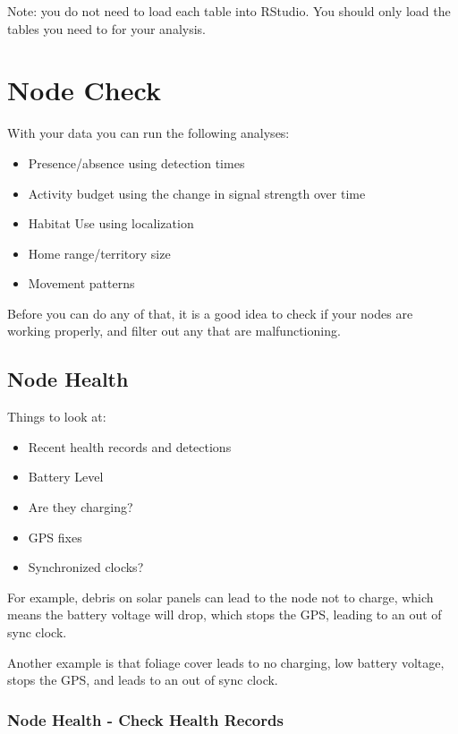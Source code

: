 \documentclass[
]{book}
\providecommand{\tightlist}{%
  \setlength{\itemsep}{0pt}\setlength{\parskip}{0pt}}
\begin{document}
Note: you do not need to load each table into RStudio. You should only load the tables you need to for your analysis.

\chapter{Node Check}\label{node-check}

With your data you can run the following analyses:

\begin{itemize}
\tightlist
\item
  Presence/absence using detection times
\item
  Activity budget using the change in signal strength over time
\item
  Habitat Use using localization
\item
  Home range/territory size
\item
  Movement patterns
\end{itemize}

Before you can do any of that, it is a good idea to check if your nodes are working properly, and filter out any that are malfunctioning.

\section{Node Health}\label{node-health}

Things to look at:

\begin{itemize}
\tightlist
\item
  Recent health records and detections
\item
  Battery Level
\item
  Are they charging?
\item
  GPS fixes
\item
  Synchronized clocks?
\end{itemize}

For example, debris on solar panels can lead to the node not to charge, which means the battery voltage will drop, which stops the GPS, leading to an out of sync clock.

Another example is that foliage cover leads to no charging, low battery voltage, stops the GPS, and leads to an out of sync clock.

\subsection{Node Health - Check Health Records}\label{node-health---check-health-records}
\end{document}
